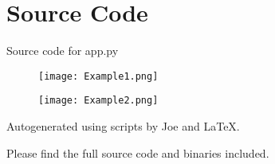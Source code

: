 \documentclass[12pt]{article}
\begin{document}
\maketitle
\pagebreak


\section{Source Code}

Source code for \textsf{app.py}


% 

\newpage

\begin{figure}[h]
  \centering
    \texttt{[image: Example1.png]}
\end{figure}

\begin{figure}[h]
  \centering
    \texttt{[image: Example2.png]}
\end{figure}

\newpage

Autogenerated using scripts by Joe and \LaTeX.

Please find the full source code and binaries included.
\end{document}
